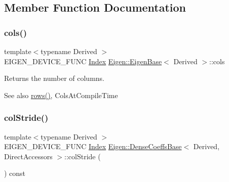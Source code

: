 \subsection{Member Function Documentation}
\mbox{\label{class_eigen_1_1_dense_coeffs_base_3_01_derived_00_01_direct_accessors_01_4_a7b0b45c7351847696c911ce8aa2abbdb}} 
\subsubsection{\texorpdfstring{cols()}{cols()}}
{\footnotesize\ttfamily template$<$typename Derived $>$ \\
E\+I\+G\+E\+N\+\_\+\+D\+E\+V\+I\+C\+E\+\_\+\+F\+U\+NC \mbox{\hyperlink{struct_eigen_1_1_eigen_base_a554f30542cc2316add4b1ea0a492ff02}{Index}} \mbox{\hyperlink{struct_eigen_1_1_eigen_base}{Eigen\+::\+Eigen\+Base}}$<$ Derived $>$\+::cols\hspace{0.3cm}{\ttfamily [inline]}}

\begin{DoxyReturn}{Returns}
the number of columns. 
\end{DoxyReturn}
\begin{DoxySeeAlso}{See also}
\mbox{\hyperlink{struct_eigen_1_1_eigen_base_a8141320ba8df384426c298b32b000d8e}{rows()}}, Cols\+At\+Compile\+Time 
\end{DoxySeeAlso}
\mbox{\label{class_eigen_1_1_dense_coeffs_base_3_01_derived_00_01_direct_accessors_01_4_ab4ec982807214e8e7ce4d27f7009a43d}} 
\subsubsection{\texorpdfstring{colStride()}{colStride()}}
{\footnotesize\ttfamily template$<$typename Derived $>$ \\
E\+I\+G\+E\+N\+\_\+\+D\+E\+V\+I\+C\+E\+\_\+\+F\+U\+NC \mbox{\hyperlink{struct_eigen_1_1_eigen_base_a554f30542cc2316add4b1ea0a492ff02}{Index}} \mbox{\hyperlink{class_eigen_1_1_dense_coeffs_base}{Eigen\+::\+Dense\+Coeffs\+Base}}$<$ Derived, Direct\+Accessors $>$\+::col\+Stride (\begin{DoxyParamCaption}{ }\end{DoxyParamCaption}) const\hspace{0.3cm}{\ttfamily [inline]}}

